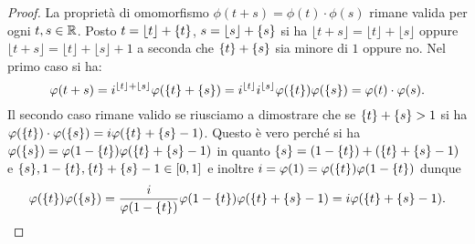 \begin{proof}
La proprietà di omomorfismo $\phi(t+s)=\phi(t)\cdot\phi(s)$ 
rimane valida per ogni $t,s\in{\mathbb R}$.
Posto $t=\lfloor t \rfloor +{\left\{ t \right\}}$, $s=\lfloor s \rfloor+{\left\{ s \right\}}$ si ha 
$\lfloor t+s \rfloor=\lfloor t \rfloor + \lfloor s \rfloor$ 
oppure $\lfloor t+s \rfloor=\lfloor t \rfloor +\lfloor s \rfloor +1$ a seconda che 
${\left\{ t \right\}}+{\left\{ s \right\}}$ sia minore di $1$ oppure no.
Nel primo caso si ha:
\[
\varphi(t+s) = i^{\lfloor t \rfloor +\lfloor s \rfloor}\varphi({\left\{ t \right\}}+{\left\{ s \right\}})
  = i^{\lfloor t \rfloor }i^{\lfloor s \rfloor}\varphi({\left\{ t \right\}})\varphi({\left\{ s \right\}})
  = \varphi(t)\cdot\varphi(s).
\]
Il secondo caso rimane valido se riusciamo a dimostrare che 
se ${\left\{ t \right\}}+{\left\{ s \right\}}>1$ si ha 
$\varphi({\left\{ t \right\}})\cdot \varphi({\left\{ s \right\}}) = i\varphi({\left\{ t \right\}}+{\left\{ s \right\}}-1)$.
Questo è vero perché si ha
$\varphi({\left\{ s \right\}})=\varphi(1-{\left\{ t \right\}})\varphi({\left\{ t \right\}}+{\left\{ s \right\}}-1)$ in quanto 
${\left\{ s \right\}}=(1-{\left\{ t \right\}})+({\left\{ t \right\}}+{\left\{ s \right\}}-1)$ 
e ${\left\{ s \right\}},1-{\left\{ t \right\}},{\left\{ t \right\}}+{\left\{ s \right\}}-1\in[0,1]$
e inoltre $i=\varphi(1)=\varphi({\left\{ t \right\}})\varphi(1-{\left\{ t \right\}})$
dunque 
\[
\varphi({\left\{ t \right\}})\varphi({\left\{ s \right\}}) 
  = \frac{i}{\varphi(1-{\left\{ t \right\}})}\varphi(1-{\left\{ t \right\}})\varphi({\left\{ t \right\}}+{\left\{ s \right\}}-1)
  = i \varphi({\left\{ t \right\}}+{\left\{ s \right\}}-1).
\]
\end{proof}

